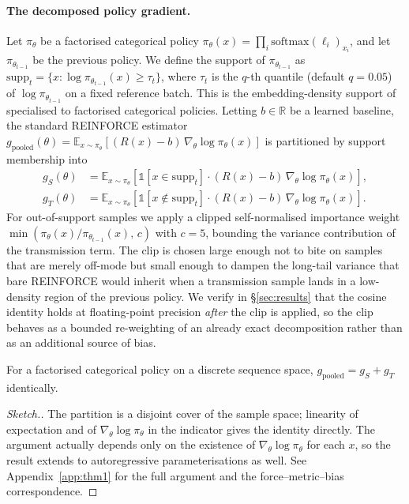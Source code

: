 \paragraph{The decomposed policy gradient.} Let $\pi_{\theta}$ be a factorised categorical policy $\pi_\theta(x)=\prod_i \mathrm{softmax}(\ell_i)_{x_i}$, and let $\pi_{\theta_{t-1}}$ be the previous policy. We define the support of $\pi_{\theta_{t-1}}$ as $\mathrm{supp}_t = \{ x : \log \pi_{\theta_{t-1}}(x) \geq \tau_t \}$, where $\tau_t$ is the $q$-th quantile (default $q=0.05$) of $\log \pi_{\theta_{t-1}}$ on a fixed reference batch. This is the embedding-density support of \citet{kim2025deltacs} specialised to factorised categorical policies. Letting $b\in\mathbb{R}$ be a learned baseline, the standard REINFORCE estimator $g_{\mathrm{pooled}}(\theta) = \mathbb{E}_{x\sim\pi_\theta}[(R(x)-b)\,\nabla_\theta \log\pi_\theta(x)]$ is partitioned by support membership into
\begin{align}
g_S(\theta) &= \mathbb{E}_{x\sim\pi_\theta} \left[ \mathbb{1}[x\in\mathrm{supp}_t] \cdot (R(x)-b)\,\nabla_\theta \log\pi_\theta(x) \right], \\
g_T(\theta) &= \mathbb{E}_{x\sim\pi_\theta} \left[ \mathbb{1}[x\notin\mathrm{supp}_t] \cdot (R(x)-b)\,\nabla_\theta \log\pi_\theta(x) \right].
\end{align}
For out-of-support samples we apply a clipped self-normalised importance weight $\min(\pi_\theta(x)/\pi_{\theta_{t-1}}(x),\, c)$ with $c=5$, bounding the variance contribution of the transmission term. The clip is chosen large enough not to bite on samples that are merely off-mode but small enough to dampen the long-tail variance that bare REINFORCE would inherit when a transmission sample lands in a low-density region of the previous policy. We verify in §\ref{sec:results} that the cosine identity holds at floating-point precision \emph{after} the clip is applied, so the clip behaves as a bounded re-weighting of an already exact decomposition rather than as an additional source of bias.

\begin{theorem}[Exactness]
\label{thm:exact}
For a factorised categorical policy on a discrete sequence space, $g_{\mathrm{pooled}} = g_S + g_T$ identically.
\end{theorem}
\begin{proof}[Sketch.] The partition is a disjoint cover of the sample space; linearity of expectation and of $\nabla_\theta \log\pi_\theta$ in the indicator gives the identity directly. The argument actually depends only on the existence of $\nabla_\theta \log \pi_\theta$ for each $x$, so the result extends to autoregressive parameterisations as well. See Appendix~\ref{app:thm1} for the full argument and the \citet{frank2025price} force--metric--bias correspondence. \end{proof}

